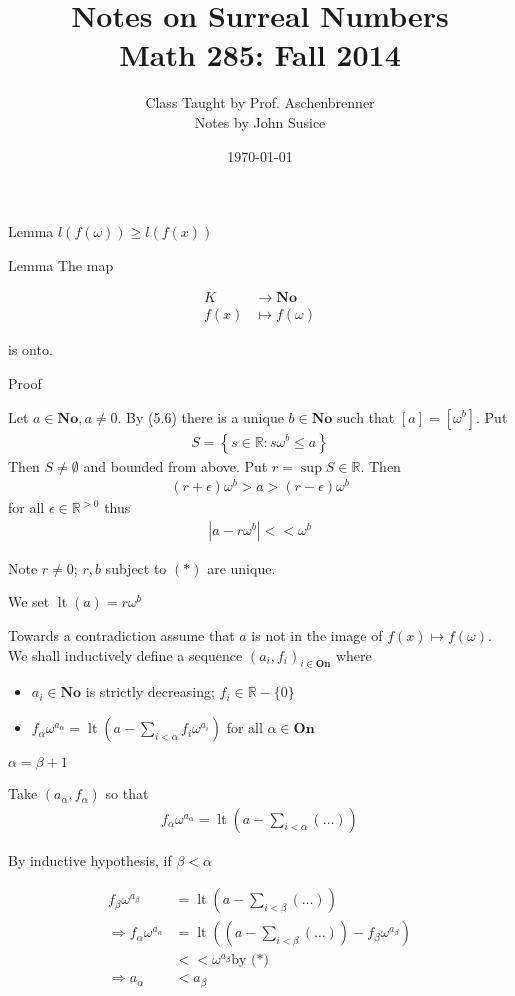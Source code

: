 \documentclass{article}
\title{Notes on Surreal Numbers \\ Math 285: Fall 2014}
\author{Class Taught by Prof. Aschenbrenner \\ Notes by John Susice}
\date{\today}
\newcommand{\R}{\mathbb{R}}
\newcommand{\No}{\mathbf{No}}
\newcommand{\On}{\mathbf{On}}
\newcommand{\paren}[1]{\left( #1 \right)}
\newcommand{\brac}[1]{\left[ #1 \right]}
\newcommand{\curly}[1]{\left\{ #1 \right\}}
\newcommand{\abs}[1]{\left| #1 \right|}
\newcommand{\arr}{\rightarrow}
\DeclareMathOperator{\lt}{lt}
\newcommand{\w}{\omega}
\begin{document}
\maketitle{}

Lemma $l(f(\w)) \geq l(f(x))$

Lemma The map

\begin{align*}
	K &\arr \No \\
	f(x) &\mapsto f(\w)
\end{align*}

is onto.

Proof

Let $a \in \No, a \neq 0$. By (5.6) there is a unique $b \in \No$ such that $\brac{a} = \brac{\w^b}$.
Put
\begin{align*}
	S = \curly{s \in \R \colon s\w^b \leq a}
\end{align*}
Then $S \neq \emptyset$ and bounded from above.
Put $r = \sup S \in \R$.
Then
\begin{align*}
	(r + \epsilon)\w^b > a > (r - \epsilon)\w^b
\end{align*}
for all $\epsilon \in \R^{>0}$
thus
\begin{align*}
	\abs{a - r\w^b} << \w^b \tag{*}
\end{align*}

Note $r \neq 0$; $r,b$ subject to $(*)$ are unique.

We set $\lt(a) = r\w^b$

Towards a contradiction assume that $a$ is not in the image of $f(x) \mapsto f(\w)$.
We shall inductively define a sequence $(a_i, f_i)_{i \in \On}$ where 

\begin{itemize}
	\item $a_i \in \No$ is strictly decreasing; $f_i \in \R - \{0\}$
	\item $f_\alpha \w^{a_\alpha} = \lt\paren{a - \sum_{i < \alpha} f_i\w^{a_i}}$ for all $\alpha \in \On$
\end{itemize}

$\alpha = \beta + 1$

Take $(a_\alpha, f_\alpha)$ so that
\begin{align*}
	f_\alpha\w^{a_\alpha} = \lt\paren{a - \sum_{i < \alpha}(\ldots)}
\end{align*}

By inductive hypothesis, if $\beta < \alpha$

\begin{align*}
	f_\beta\w^{a_\beta} &= \lt\paren{a - \sum_{i < \beta}(\ldots)} \\
	\Rightarrow f_\alpha\w^{a_\alpha} &= \lt\paren{\paren{a - \sum_{i < \beta}(\ldots)} - f_\beta\w^{a_\beta}} \\
	&<< \w^{a_\beta} \text{by (*)} \\
	\Rightarrow a_\alpha &< a_\beta
\end{align*}
\end{document}
